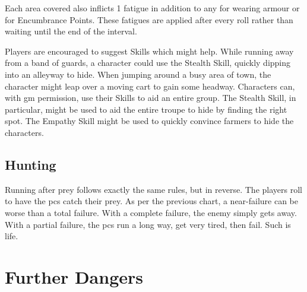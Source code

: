 \begin{multicols}{2}
Each area covered also inflicts 1 \gls{fatigue} in addition to any for wearing armour or for Encumbrance Points.
These \glspl{fatigue} are applied after every roll rather than waiting until the end of the interval.

Players are encouraged to suggest Skills which might help.
While running away from a band of guards, a character could use the Stealth Skill, quickly dipping into an alleyway to hide.
When jumping around a busy area of town, the character might leap over a moving cart to gain some headway.
Characters can, with \gls{gm} permission, use their Skills to aid an entire group.
The Stealth Skill, in particular, might be used to aid the entire troupe to hide by finding the right spot.
The Empathy Skill might be used to quickly convince farmers to hide the characters.

\subsection{Hunting}

Running after prey follows exactly the same rules, but in reverse.
The players roll to have the \glspl{pc} catch their prey.
As per the previous chart, a near-failure can be worse than a total failure.
With a complete failure, the enemy simply gets away.
With a partial failure, the \glspl{pc} run a long way, get very tired, then fail.
Such is life.

\end{multicols}

\huntchart

\section{Further Dangers}

